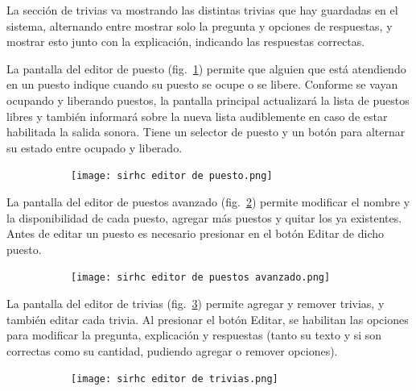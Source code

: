 \documentclass[twoside]{article}
\begin{document}
La sección de trivias va mostrando las distintas trivias que hay guardadas en el sistema, alternando entre mostrar solo la pregunta y opciones de respuestas, y mostrar esto junto con la explicación, indicando las respuestas correctas.

La pantalla del editor de puesto (fig.~\ref{fig:editorPuestoManual}) permite que alguien que está atendiendo en un puesto indique cuando su puesto se ocupe o se libere. Conforme se vayan ocupando y liberando puestos, la pantalla principal actualizará la lista de puestos libres y también informará sobre la nueva lista audiblemente en caso de estar habilitada la salida sonora. Tiene un selector de puesto y un botón para alternar su estado entre ocupado y liberado.
\begin{figure}[H]
	\caption{Interfaz del editor de puesto}
    \begin{subfigure}{1\textwidth}
	\texttt{[image: sirhc editor de puesto.png]}
    \end{subfigure}
	\label{fig:editorPuestoManual}
\end{figure}
\vspace{-1.0\baselineskip}

La pantalla del editor de puestos avanzado (fig.~\ref{fig:editorPuestosAvanzadoManual}) permite modificar el nombre y la disponibilidad de cada puesto, agregar más puestos y quitar los ya existentes. Antes de editar un puesto es necesario presionar en el botón Editar de dicho puesto.
\begin{figure}[H]
	\caption{Interfaz del editor de puestos avanzado}
    \begin{subfigure}{1\textwidth}
	\texttt{[image: sirhc editor de puestos avanzado.png]}
    \end{subfigure}
    \label{fig:editorPuestosAvanzadoManual}
\end{figure}
\vspace{-1.0\baselineskip}

La pantalla del editor de trivias (fig.~\ref{fig:editorTriviasManual}) permite agregar y remover trivias, y también editar cada trivia. Al presionar el botón Editar, se habilitan las opciones para modificar la pregunta, explicación y respuestas (tanto su texto y si son correctas como su cantidad, pudiendo agregar o remover opciones).
\begin{figure}[H]
	\caption{Interfaz del editor de trivias}
    \begin{subfigure}{1\textwidth}
	\texttt{[image: sirhc editor de trivias.png]}
    \end{subfigure}
	\label{fig:editorTriviasManual}
\end{figure}
\vspace{-1.0\baselineskip}
\end{document}
